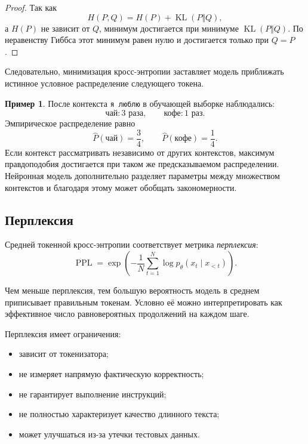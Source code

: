\documentclass[12pt,a4paper]{article}
\DeclareMathOperator{\KL}{KL}
\newcommand{\1}{\mathbf{1}}
\theoremstyle{definition}
\newtheorem{example}[theorem]{Пример}
\theoremstyle{remark}
\begin{document}
\begin{proof}
Так как
\[
H(P,Q)=H(P)+\KL(P\Vert Q),
\]
а $H(P)$ не зависит от $Q$, минимум достигается при минимуме
$\KL(P\Vert Q)$. По неравенству Гиббса этот минимум равен нулю и
достигается только при $Q=P$.
\end{proof}

Следовательно, минимизация кросс-энтропии заставляет модель приближать
истинное условное распределение следующего токена.

\begin{example}
После контекста \texttt{я люблю} в обучающей выборке наблюдались:
\[
\texttt{чай}:3\text{ раза},
\qquad
\texttt{кофе}:1\text{ раз}.
\]
Эмпирическое распределение равно
\[
\widehat{P}(\texttt{чай})=\frac{3}{4},
\qquad
\widehat{P}(\texttt{кофе})=\frac{1}{4}.
\]
Если контекст рассматривать независимо от других контекстов, максимум
правдоподобия достигается при таком же предсказываемом распределении.
Нейронная модель дополнительно разделяет параметры между множеством
контекстов и благодаря этому может обобщать закономерности.
\end{example}

\subsection{Перплексия}

Средней токенной кросс-энтропии соответствует метрика
\emph{перплексия}:
\[
\operatorname{PPL}
=
\exp\left(
-\frac{1}{N}\sum_{t=1}^{N}
\log p_\theta(x_t\mid x_{<t})
\right).
\]

Чем меньше перплексия, тем большую вероятность модель в среднем
приписывает правильным токенам. Условно её можно интерпретировать как
эффективное число равновероятных продолжений на каждом шаге.

Перплексия имеет ограничения:

\begin{itemize}
    \item зависит от токенизатора;
    \item не измеряет напрямую фактическую корректность;
    \item не гарантирует выполнение инструкций;
    \item не полностью характеризует качество длинного текста;
    \item может улучшаться из-за утечки тестовых данных.
\end{itemize}

\end{document}
